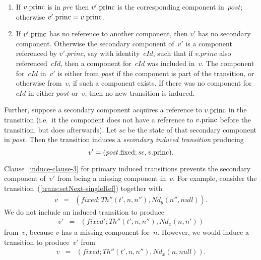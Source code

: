 \begin{definition}
\begin{enumerate}
\item If $v.\mathrm{princ}$ is in $pre$ then $v'.\mathrm{princ}$ is the corresponding
  component in~$post$; otherwise $v'.\mathrm{princ} = v.\mathrm{princ}$.


\item\label{induce-clause-3} If $v'.\mathrm{princ}$ has no reference to another
  component, then $v'$ has no secondary component.  Otherwise the secondary
  component of~$v'$ is a component referenced by $v'.princ$, say with
  identity~$cId$, such that if $v.princ$ also referenced~$cId$, then a
  component for~$cId$ was included in~$v$.  The component for~$cId$ in~$v'$ is
  either from $post$ if the component is part of the transition, or otherwise
  from~$v$, if such a component exists.  If there was no component for~$cId$
  in either $post$ or~$v$, then no new transition is induced.
\end{enumerate}
%

Further, suppose a secondary component acquires a reference to $v.\mathrm{princ}$ in
the transition (i.e.~it the component does not have a reference to $v.\mathrm{princ}$
before the transition, but does afterwards).  Let $sc$ be the state of that
secondary component in $post$.  Then the transition induces a \emph{secondary
  induced transition} producing
\[\it
v' = (post.\mathrm{fixed}; sc, v.\mathrm{princ}).
\]
\end{definition}


Clause~\ref{induce-clause-3} for primary induced transitions prevents the
secondary component of~$v'$ from being a missing component in~$v$.  For
example, consider the transition~(\ref{trans:setNext-singleRef}) together with
\begin{eqnarray*}
v & = & (fixed; Th''(t', n, n''), Nd_y(n'',null)) .
\end{eqnarray*}
%
We do not include an induced transition to produce
\begin{eqnarray*}
v' & = & (fixed'; Th''(t', n, n''),  Nd_x(n, n'))
\end{eqnarray*}
from~$v$, because $v$ has a missing component for~$n$.  However, we would
induce a transition to produce~$v'$ from
\begin{eqnarray*}
v & = & (fixed; Th''(t', n, n''),Nd_x(n, null) ).
\end{eqnarray*}

